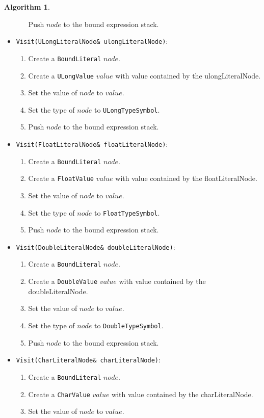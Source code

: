 \documentclass[a4paper,oneside,11pt]{book}
\theoremstyle{definition}
\newtheorem{algo}{Algorithm}[section]
\begin{document}
\begin{algo}
\begin{itemize}
\begin{enumerate}
Push $node$ to the bound expression stack.
\end{enumerate}
\item
\verb|Visit(ULongLiteralNode& ulongLiteralNode)|:
\begin{enumerate}
\item
Create a \verb|BoundLiteral| $node$.
\item
Create a \verb|ULongValue| $value$ with value contained by the ulongLiteralNode.
\item
Set the value of $node$ to $value$.
\item
Set the type of $node$ to \verb|ULongTypeSymbol|.
\item
Push $node$ to the bound expression stack.
\end{enumerate}
\item
\verb|Visit(FloatLiteralNode& floatLiteralNode)|:
\begin{enumerate}
\item
Create a \verb|BoundLiteral| $node$.
\item
Create a \verb|FloatValue| $value$ with value contained by the floatLiteralNode.
\item
Set the value of $node$ to $value$.
\item
Set the type of $node$ to \verb|FloatTypeSymbol|.
\item
Push $node$ to the bound expression stack.
\end{enumerate}
\item
\verb|Visit(DoubleLiteralNode& doubleLiteralNode)|:
\begin{enumerate}
\item
Create a \verb|BoundLiteral| $node$.
\item
Create a \verb|DoubleValue| $value$ with value contained by the doubleLiteralNode.
\item
Set the value of $node$ to $value$.
\item
Set the type of $node$ to \verb|DoubleTypeSymbol|.
\item
Push $node$ to the bound expression stack.
\end{enumerate}
\item
\verb|Visit(CharLiteralNode& charLiteralNode)|:
\begin{enumerate}
\item
Create a \verb|BoundLiteral| $node$.
\item
Create a \verb|CharValue| $value$ with value contained by the charLiteralNode.
\item
Set the value of $node$ to $value$.

\end{enumerate}
\end{itemize}
\end{algo}
\end{document}
